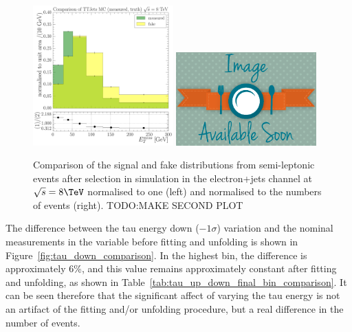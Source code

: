 \begin{figure}[hbtp]
    \centering
     \includegraphics[width=0.48\textwidth]{Chapters/04_Analysis/04b_XSections/images/tau_cross_checks/comparison_measured_fakeTTJets_normalised_to_one.pdf}\hfill
     \includegraphics[width=0.48\textwidth]{Chapters/04_Analysis/04b_XSections/images/placeholder.png}
\caption{Comparison of the signal and fake distributions from semi-leptonic \ttbar events after
     selection in simulation in the electron+jets channel at $\sqrt{s}=8\TeV$ normalised to one (left) and
     normalised to the numbers of events (right). TODO:MAKE SECOND PLOT} %
     \label{fig:tau_shape_number_comparison}
\end{figure}

The difference between the tau energy down ($-1\sigma$) variation and the nominal measurements in the \met
variable before fitting and unfolding is shown in Figure~\ref{fig:tau_down_comparison}. In the highest \met
bin, the difference is approximately 6\%, and this value remains approximately constant after fitting and
unfolding, as shown in Table~\ref{tab:tau_up_down_final_bin_comparison}. It can be seen therefore that the
significant affect of varying the tau energy is not an artifact of the fitting and/or unfolding procedure, but
a real difference in the number of events.


